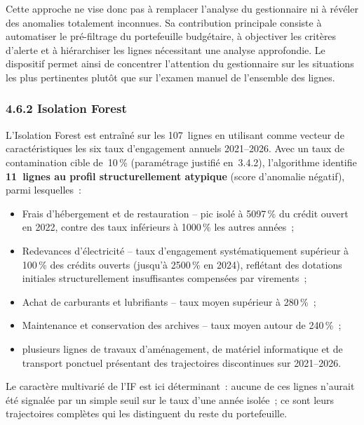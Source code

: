 Cette approche ne vise donc pas \`a remplacer l'analyse du gestionnaire
ni \`a r\'ev\'eler des anomalies totalement inconnues. Sa contribution
principale consiste \`a automatiser le pr\'e-filtrage du portefeuille
budg\'etaire, \`a objectiver les crit\`eres d'alerte et \`a hi\'erarchiser
les lignes n\'ecessitant une analyse approfondie. Le dispositif permet
ainsi de concentrer l'attention du gestionnaire sur les situations les
plus pertinentes plut\^ot que sur l'examen manuel de l'ensemble des lignes.

\subsubsection*{4.6.2 \quad Isolation Forest}

L'Isolation Forest est entra\^in\'e sur les 107~lignes en utilisant comme
vecteur de caract\'eristiques les six taux d'engagement annuels 2021--2026.
Avec un taux de contamination cible de~10\,\% (param\'etrage justifi\'e
en~3.4.2), l'algorithme identifie \textbf{11~lignes au profil structurellement
atypique} (score d'anomalie n\'egatif), parmi lesquelles~:

\begin{itemize}
    \item \og Frais d'h\'ebergement et de restauration \fg{} -- pic
    isol\'e \`a 5097\,\% du cr\'edit ouvert en 2022, contre des taux
    inf\'erieurs \`a 1000\,\% les autres ann\'ees~;
    \item \og Redevances d'\'electricit\'e \fg{} -- taux d'engagement
    syst\'ematiquement sup\'erieur \`a 100\,\% des cr\'edits ouverts (jusqu'\`a
    2500\,\% en 2024), refl\'etant des dotations initiales structurellement
    insuffisantes compens\'ees par virements~;
    \item \og Achat de carburants et lubrifiants \fg{} -- taux moyen
    sup\'erieur \`a 280\,\%~;
    \item \og Maintenance et conservation des archives \fg{} -- taux moyen
    autour de 240\,\%~;
    \item plusieurs lignes de travaux d'am\'enagement, de mat\'eriel
    informatique et de transport ponctuel pr\'esentant des trajectoires
    discontinues sur 2021--2026.
\end{itemize}

Le caract\`ere multivari\'e de l'IF est ici d\'eterminant~: aucune de ces
lignes n'aurait \'et\'e signal\'ee par un simple seuil sur le taux d'une
ann\'ee isol\'ee~; ce sont leurs trajectoires compl\`etes qui les distinguent
du reste du portefeuille.

